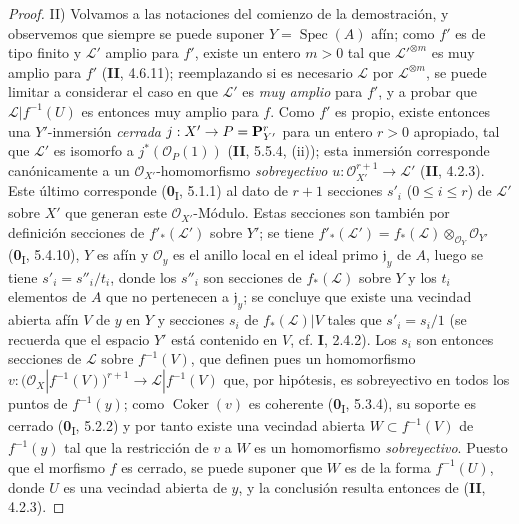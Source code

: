 \documentclass[10pt,oneside,openany]{book}
\theoremstyle{egaenv}\newtheorem*{env}{---}
\theoremstyle{egastatement}
\theoremstyle{egadescription}
\newcommand{\oldpage}[2][]{\marginnote{\normalfont\scriptsize\textbf{#1}\,|\,#2}\ignorespaces}
\renewcommand{\leq}{\leqslant}
\renewcommand{\to}{\mathchoice{\longrightarrow}{\rightarrow}{\rightarrow}{\rightarrow}}
\begin{document}
\begin{proof}
\noindent II) Volvamos a las notaciones del comienzo de la demostración,
y observemos que
\oldpage[III]{146}
siempre se puede suponer $Y=\operatorname{Spec}(A)$
afín; como $f'$ es de tipo finito y $\mathcal L'$ amplio para $f'$,
existe un entero $m>0$ tal que $\mathcal L'^{\otimes m}$ es muy amplio para
$f'$ (\textbf{II}, 4.6.11); reemplazando si es necesario $\mathcal L$ por
$\mathcal L^{\otimes m}$, se puede limitar a considerar el caso en que
$\mathcal L'$ es \emph{muy amplio} para $f'$, y a probar que
$\mathcal L|f^{-1}(U)$ es entonces muy amplio para $f$. Como $f'$ es propio,
existe entonces una $Y'$-inmersión \emph{cerrada}
$j:X'\to P=\mathbf P_{Y'}^r$ para un entero $r>0$ apropiado, tal que
$\mathcal L'$ es isomorfo a $j^*(\mathcal O_P(1))$ (\textbf{II}, 5.5.4, (ii));
esta inmersión corresponde canónicamente a un $\mathcal O_{X'}$-homomorfismo
\emph{sobreyectivo}
$u:\mathcal O_{X'}^{r+1}\longrightarrow\mathcal L'$
(\textbf{II}, 4.2.3). Este último corresponde (\textbf{0}\textsubscript{I}, 5.1.1) al dato
de $r+1$ secciones $s'_i$ ($0\leq i\leq r$) de $\mathcal L'$ sobre
$X'$ que generan este $\mathcal O_{X'}$-Módulo. Estas secciones son también por
definición secciones de $f'_*(\mathcal L')$ sobre $Y'$; se tiene
$f'_*(\mathcal L')=f_*(\mathcal L)\otimes_{\mathcal O_Y}\mathcal O_{Y'}$
(\textbf{0}\textsubscript{I}, 5.4.10), $Y$ es afín y $\mathcal O_y$ es el anillo
local en el ideal primo $\mathfrak j_y$ de $A$, luego se tiene
$s'_i=s''_i/t_i$, donde los $s''_i$ son secciones de $f_*(\mathcal L)$
sobre $Y$ y los $t_i$ elementos de $A$ que no pertenecen a
$\mathfrak j_y$; se concluye que existe una vecindad abierta afín $V$
de $y$ en $Y$ y secciones $s_i$ de $f_*(\mathcal L)|V$ tales que
$s'_i=s_i/1$ (se recuerda que el espacio $Y'$ está contenido en $V$, cf. \textbf{I},
2.4.2). Los $s_i$ son entonces secciones de $\mathcal L$ sobre
$f^{-1}(V)$, que definen pues un homomorfismo
$v:\bigl(\mathcal O_X|f^{-1}(V)\bigr)^{r+1}
\longrightarrow\mathcal L|f^{-1}(V)$
que, por hipótesis, es sobreyectivo en todos los puntos de $f^{-1}(y)$; como
$\operatorname{Coker}(v)$ es coherente (\textbf{0}\textsubscript{I}, 5.3.4), su
soporte es cerrado (\textbf{0}\textsubscript{I}, 5.2.2) y por tanto existe una
vecindad abierta $W\subset f^{-1}(V)$ de $f^{-1}(y)$ tal que la restricción
de $v$ a $W$ es un homomorfismo \emph{sobreyectivo}. Puesto que el morfismo $f$ es
cerrado, se puede suponer que $W$ es de la forma $f^{-1}(U)$, donde $U$ es una
vecindad abierta de $y$, y la conclusión resulta entonces de (\textbf{II}, 4.2.3).
\end{proof}
\end{document}
